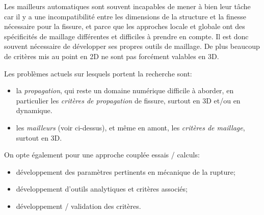 Les mailleurs automatiques sont souvent incapables de mener à bien leur tâche car
il y a une incompatibilité entre les dimensions de la structure et la finesse nécessaire
pour la fissure, et parce que les approches locale et globale ont des spécificités de maillage
différentes et difficiles à prendre en compte.
Il est donc souvent nécessaire de développer ses propres outils de maillage.
De plus beaucoup de critères mis au point en 2D ne sont pas forcément valables
en 3D.

\medskip
Les problèmes actuels sur lesquels portent la recherche sont:
\begin{itemize}
   \item la \emph{propagation}, qui reste un domaine numérique difficile à aborder, en
	particulier les \emph{critères de propagation} de fissure, surtout en 3D et/ou en dynamique.
   \item les \emph{mailleurs} (voir ci-dessus), et même en amont, les \emph{critères de maillage}, 
	surtout en 3D.	
\end{itemize}

\medskip
On opte également pour une approche couplée essais / calculs:
\begin{itemize}
   \item développement des paramètres pertinents en mécanique de la rupture;
   \item développement d'outils analytiques et critères associés;
   \item développement / validation des critères.
\end{itemize}

